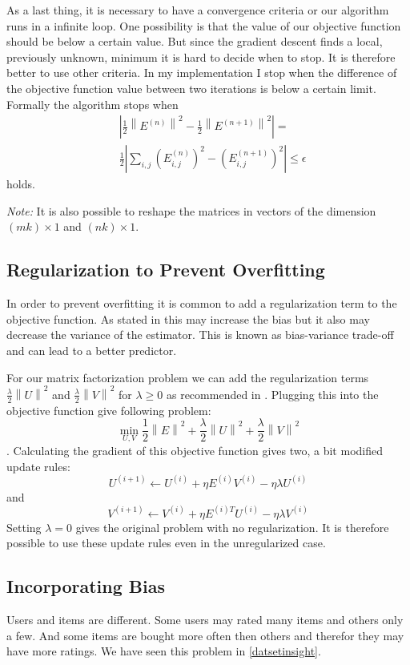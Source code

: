 \documentclass[DIV=14,twocolumn]{scrartcl}
\newcommand{\norm}[1]{\left\lVert#1\right\rVert}
\begin{document}
As a last thing, it is necessary to have a convergence criteria or our algorithm runs in a infinite loop. One possibility is that the value of our objective function should be below a certain value. But since the gradient descent finds a local, previously unknown, minimum it is hard to decide when to stop. It is therefore better to use other criteria. In my implementation I stop when the difference of the objective function value between two iterations is below a certain limit. Formally the algorithm stops when
\begin{equation*}
\begin{split}
&|\frac{1}{2}\norm{E^{(n)}}^2-\frac{1}{2}\norm{E^{(n+1)}}^2|=\\
&\frac{1}{2}|\sum_{i,j}(E_{i,j}^{(n)})^2-(E_{i,j}^{(n+1)})^2|\leq\epsilon
\end{split}
\end{equation*} $$$$ holds.

\textit{Note:} It is also possible to reshape the matrices in vectors of the dimension $(mk)\times1$ and $(nk)\times1$. 

\subsection{Regularization to Prevent Overfitting}
In order to prevent overfitting it is common to add a regularization term to the objective function. As stated in \cite{Gi19} this may increase the bias but it also may decrease the variance of the estimator. This is known as bias-variance trade-off and can lead to a better predictor. 

For our matrix factorization problem we can  add the regularization terms $\frac{\lambda}{2}\norm{U}^2$ and $\frac{\lambda}{2}\norm{V}^2$ for $\lambda \geq 0$ as recommended in \cite{Ag16}.
Plugging this into the objective function give following problem: $$\min_{U,V} \frac{1}{2}\norm{E}^2 + \frac{\lambda}{2}\norm{U}^2 + \frac{\lambda}{2}\norm{V}^2$$. Calculating the gradient of this objective function gives two, a bit modified update rules: \[U^{(i+1)} \leftarrow U^{(i)} + \eta E^{(i)}V^{(i)} - \eta\lambda U^{(i)}\] and \[V^{(i+1)} \leftarrow V^{(i)} + \eta E^{(i)T}U^{(i)} - \eta\lambda V^{(i)}\]
Setting $\lambda = 0$ gives the original problem with no regularization. It is therefore possible to use these update rules even in the unregularized case.
\subsection{Incorporating Bias}
Users and items are different. Some users may rated many items and others only a few. And some items are bought more often then others and therefor they may have more ratings. We have seen this problem in \autoref{datsetinsight}.
 
\end{document}
